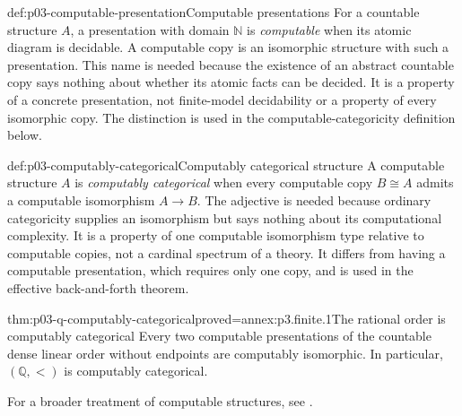 \begin{hbdefinition}{def:p03-computable-presentation}{Computable presentations}
For a countable structure \(A\), a presentation with domain \(\mathbb N\) is
\emph{computable} when its atomic diagram is decidable.  A computable copy is
an isomorphic structure with such a presentation.  This name is needed because
the existence of an abstract countable copy says nothing about whether its
atomic facts can be decided.  It is a property of a concrete presentation,
not finite-model decidability or a property of every isomorphic copy.  The
distinction is used in the computable-categoricity definition below.
\end{hbdefinition}

\begin{hbdefinition}{def:p03-computably-categorical}{Computably categorical structure}
A computable structure \(A\) is \emph{computably categorical} when every
computable copy \(B\cong A\) admits a computable isomorphism \(A\to B\).
The adjective is needed because ordinary categoricity supplies an isomorphism
but says nothing about its computational complexity.  It is a property of one
computable isomorphism type relative to computable copies, not a cardinal
spectrum of a theory.  It differs from having a computable presentation, which
requires only one copy, and is used in the effective back-and-forth theorem.
\end{hbdefinition}

\begin{hbtheorem}{thm:p03-q-computably-categorical}{proved=annex:p3.finite.1}{The rational order is computably categorical}
Every two computable presentations of the countable dense linear order without
endpoints are computably isomorphic.  In particular,
\((\mathbb Q,<)\) is computably categorical.
\end{hbtheorem}

For a broader treatment of computable structures, see
\textcite{AshKnight2000}.
